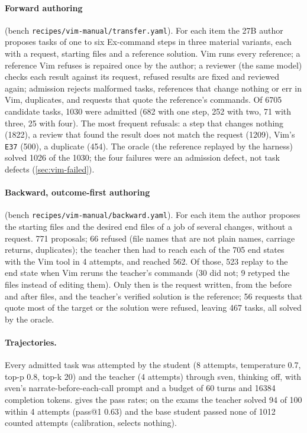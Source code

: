 \paragraph{Forward authoring} (bench \texttt{recipes/vim-manual/transfer.yaml}). For each item the 27B author proposes tasks
of one to six Ex-command steps in three material variants, each with a request, starting files and a reference solution.
Vim runs every reference; a reference Vim refuses is repaired once by the author; a reviewer (the same model) checks each
result against its request, refused results are fixed and reviewed again; admission rejects malformed tasks, references that
change nothing or err in Vim, duplicates, and requests that quote the reference's commands. Of 6705 candidate tasks, 1030 were
admitted (682 with one step, 252 with two, 71 with three, 25 with four). The most frequent refusals: a step that changes
nothing (1822), a review that found the result does not match the request (1209), Vim's \texttt{E37} (500), a duplicate
(454). The oracle (the reference replayed by the harness) solved 1026 of the 1030; the four failures were an admission
defect, not task defects (\cref{sec:vim-failed}).

\paragraph{Backward, outcome-first authoring} (bench \texttt{recipes/vim-manual/backward.yaml}). For each item the author
proposes the starting files and the desired end files of a job of several changes, without a request. 771 proposals; 66
refused (file names that are not plain names, carriage returns, duplicates); the teacher then had to reach each of the 705
end states with the Vim tool in 4 attempts, and reached 562. Of those, 523 replay to the end state when Vim reruns the
teacher's commands (30 did not; 9 retyped the files instead of editing them). Only then is the request written, from the
before and after files, and the teacher's verified solution is the reference; 56 requests that quote most of the target or the
solution were refused, leaving 467 tasks, all solved by the oracle.

\paragraph{Trajectories.} Every admitted task was attempted by the student (8 attempts, temperature 0.7, top-p 0.8, top-k 20)
and the teacher (4 attempts) through sven, thinking off, with sven's narrate-before-each-call prompt and a budget of 60 turns
and 16384 completion tokens.  gives the pass rates; on the exams the teacher solved 94 of 100 within 4
attempts (pass@1 0.63) and the base student passed none of 1012 counted attempts (calibration, selects nothing).

